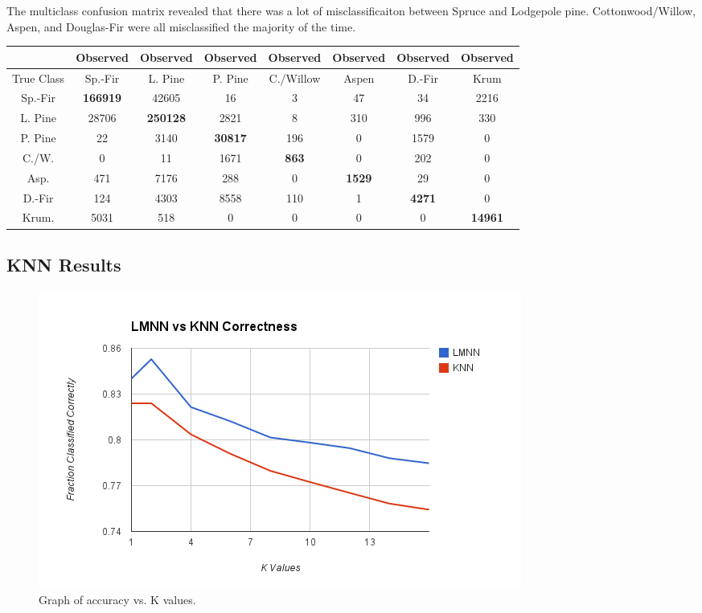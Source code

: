 \documentclass[12pt]{article}
\begin{document}
The multiclass confusion matrix revealed that there was a lot of misclassificaiton between Spruce and Lodgepole pine.  Cottonwood/Willow, Aspen, and Douglas-Fir were all misclassified the majority of the time.
\begin{center}
\begin{tabular}{|c | c| c| c| c| c |c| c|}
\hline
 & Observed& Observed& Observed& Observed& Observed& Observed& Observed \\ \hline
True Class & Sp.-Fir & L. Pine & P. Pine & C./Willow & Aspen & D.-Fir & Krum \\ \hline
Sp.-Fir & \textbf{166919} & 42605 & 16 & 3 & 47 & 34 & 2216 \\ \hline
L. Pine & 28706 & \textbf{250128} & 2821 & 8 & 310 & 996 & 330 \\ \hline
P. Pine & 22 & 3140 &  \textbf{30817} & 196 & 0 & 1579 & 0 \\ \hline
C./W. & 0 & 11 & 1671 &  \textbf{863} & 0 & 202 & 0 \\ \hline
Asp. & 471 & 7176 & 288 & 0 &  \textbf{1529} & 29 & 0 \\ \hline
D.-Fir & 124 & 4303 & 8558 & 110 & 1 &  \textbf{4271} & 0 \\ \hline
Krum. & 5031 & 518 & 0 & 0 & 0 & 0 &  \textbf{14961} \\ \hline
\end{tabular}
\end{center}

\subsection{KNN Results}



\begin{figure}[H]
\includegraphics[width=\linewidth]{images/knnvslmnn.png}
\caption{Graph of accuracy vs. K values.}
\end{figure}
\end{document}

